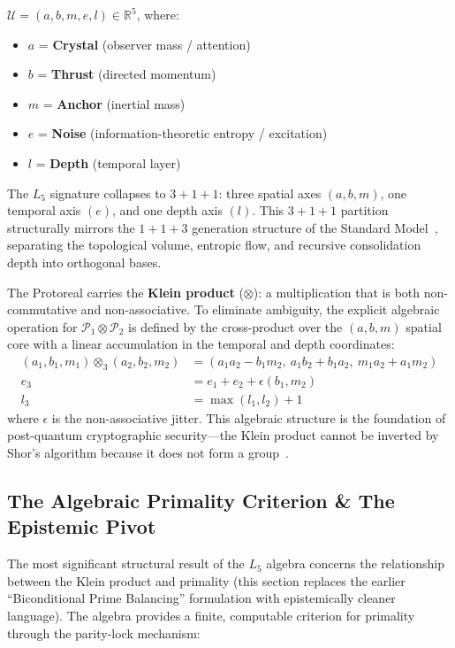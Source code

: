 \begin{definition}
$\mathcal{U} = (a, b, m, e, l) \in \mathbb{R}^5$, where:
\begin{itemize}
    \item $a$ = \textbf{Crystal} (observer mass / attention)
    \item $b$ = \textbf{Thrust} (directed momentum)
    \item $m$ = \textbf{Anchor} (inertial mass)
    \item $e$ = \textbf{Noise} (information-theoretic entropy / excitation)
    \item $l$ = \textbf{Depth} (temporal layer)
\end{itemize}
The $L_5$ signature collapses to $3 + 1 + 1$: three spatial axes $(a, b, m)$, one temporal axis $(e)$, and one depth axis $(l)$. This $3+1+1$ partition structurally mirrors the $1+1+3$ generation structure of the Standard Model~\cite{PDG2025}, separating the topological volume, entropic flow, and recursive consolidation depth into orthogonal bases.
\end{definition}

The Protoreal carries the \textbf{Klein product} ($\otimes$): a multiplication that is both non-commutative and non-associative. To eliminate ambiguity, the explicit algebraic operation for $\mathcal{P}_1 \otimes \mathcal{P}_2$ is defined by the cross-product over the $(a, b, m)$ spatial core with a linear accumulation in the temporal and depth coordinates:
\begin{align}
    (a_1, b_1, m_1) \otimes_3 (a_2, b_2, m_2) &= (a_1 a_2 - b_1 m_2, \ a_1 b_2 + b_1 a_2, \ m_1 a_2 + a_1 m_2) \\
    e_3 &= e_1 + e_2 + \epsilon(b_1, m_2) \\
    l_3 &= \max(l_1, l_2) + 1
\end{align}
where $\epsilon$ is the non-associative jitter. This algebraic structure is the foundation of post-quantum cryptographic security---the Klein product cannot be inverted by Shor's algorithm because it does not form a group~\cite{Aingel}.

\subsection{The Algebraic Primality Criterion \& The Epistemic Pivot}

The most significant structural result of the $L_5$ algebra concerns the relationship between the Klein product and primality (this section replaces the earlier ``Biconditional Prime Balancing'' formulation with epistemically cleaner language). The algebra provides a finite, computable criterion for primality through the parity-lock mechanism:

